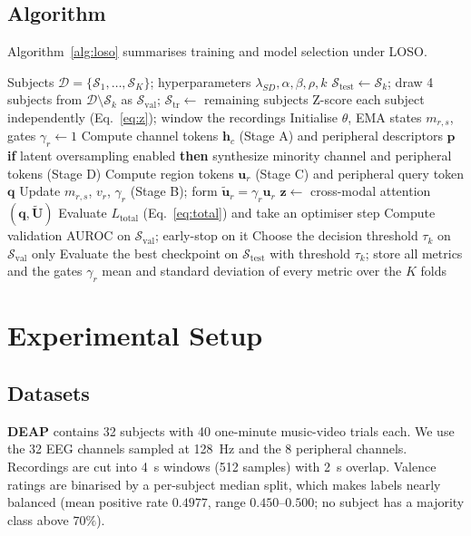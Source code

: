 \documentclass[a4paper,fleqn]{cas-sc}
\begin{document}
\subsection{Algorithm}
Algorithm~\ref{alg:loso} summarises training and model selection under LOSO.

\begin{algorithm}[t]
\caption{HCAN-CIB training and LOSO model selection}
\label{alg:loso}
\begin{algorithmic}[1]
\Require Subjects $\mathcal{D}=\{\mathcal{S}_1,\dots,\mathcal{S}_K\}$; hyperparameters $\lambda_{SD},\alpha,\beta,\rho,k$
  \State $\mathcal{S}_{\mathrm{test}}\gets\mathcal{S}_k$;\; draw 4 subjects from $\mathcal{D}\setminus\mathcal{S}_k$ as $\mathcal{S}_{\mathrm{val}}$;\; $\mathcal{S}_{\mathrm{tr}}\gets$ remaining subjects
  \State Z-score each subject independently (Eq.~\ref{eq:z}); window the recordings
  \State Initialise $\theta$, EMA states $m_{r,s}$, gates $\gamma_r\gets1$
      \State Compute channel tokens $\mathbf{h}_c$ (Stage A) and peripheral descriptors $\mathbf{p}$
      \State \textbf{if} latent oversampling enabled \textbf{then} synthesize minority channel and peripheral tokens (Stage D)
      \State Compute region tokens $\mathbf{u}_r$ (Stage C) and peripheral query token $\mathbf{q}$
      \State Update $m_{r,s}$, $v_r$, $\gamma_r$ (Stage B); form $\tilde{\mathbf{u}}_r=\gamma_r\mathbf{u}_r$
      \State $\mathbf{z}\gets$ cross-modal attention$(\mathbf{q},\tilde{\mathbf{U}})$
      \State Evaluate $L_{\mathrm{total}}$ (Eq.~\ref{eq:total}) and take an optimiser step
    \EndFor
    \State Compute validation AUROC on $\mathcal{S}_{\mathrm{val}}$; early-stop on it
  \EndFor
  \State Choose the decision threshold $\tau_k$ on $\mathcal{S}_{\mathrm{val}}$ only
  \State Evaluate the best checkpoint on $\mathcal{S}_{\mathrm{test}}$ with threshold $\tau_k$; store all metrics and the gates $\gamma_r$
\EndFor
\State \Return mean and standard deviation of every metric over the $K$ folds
\end{algorithmic}
\end{algorithm}

\section{Experimental Setup}
\label{sec:setup}

\subsection{Datasets}
\textbf{DEAP} \citep{koelstra2012deap} contains 32 subjects with 40 one-minute music-video trials each. We use the 32 EEG channels sampled at 128~Hz and the 8 peripheral channels. Recordings are cut into 4~s windows (512 samples) with 2~s overlap. Valence ratings are binarised by a per-subject median split, which makes labels nearly balanced (mean positive rate $0.4977$, range $0.450$--$0.500$; no subject has a majority class above $70\%$).
\end{document}
